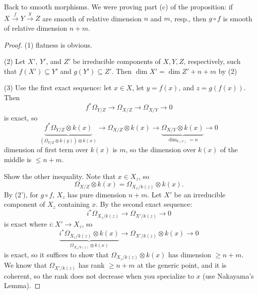  Back to smooth morphisms.  We were proving part (c) of the
 proposition: if $X\xrightarrow{f} Y \xrightarrow{g} Z$ are smooth
 of relative dimension $n$ and $m$, resp., then $g\circ f$ is
 smooth of relative dimension $n+m$.
 \begin{proof}
 (1) flatness is obvious.

 (2) Let $X'$, $Y'$, and $Z'$ be irreducible components of
 $X,Y,Z$, respectively, such that $f(X')\subseteq Y'$ and
 $g(Y')\subseteq Z'$.  Then $\dim X' = \dim Z' + n + m$ by (2)

 (3) Use the first exact sequence: let $x\in X$, let $y=f(x)$, and
 $z=g(f(x))$.  Then
 \[
    f^*\Omega_{Y/Z} \to \Omega_{X/Z} \to \Omega_{X/Y} \to 0
 \]
 is exact, so
 \[
    \underbrace{f^*\Omega_{Y/Z}\otimes k(x)}_{(\Omega_{Y/Z}\otimes k(y))\otimes k(x) } \to \Omega_{X/Z}\otimes k(x) \to
    \underbrace{\Omega_{X/Y}\otimes k(x)}_{\dim_{k(x)} = n} \to 0
 \]
 dimension of first term over $k(x)$ is $m$, so the dimension over
 $k(x)$ of the middle is $\le n+m$.

 Show the other inequality.  Note that $x\in X_z$, so
 \[
    \Omega_{X/Z}\otimes k(x) = \Omega_{X_x/k(z)} \otimes k(x).
 \]
 By (2'), for $g\circ f$, $X_z$ has pure dimension $n+m$.  Let
 $X'$ be an irreducible component of $X_z$ containing $x$.  By the
 second exact sequence:
 \[
    i^*\Omega_{X_z/k(z)} \to \Omega_{X'/k(z)} \to 0
 \]
 is exact where $i:X'\to X_z$, so
 \[
    \underbrace{i^*\Omega_{X_z/k(z)}\otimes k(x)}_{\Omega_{X_z/k(z)}\otimes k(x)} \to \Omega_{X'/k(z)}\otimes k(x) \to 0
 \]
 is exact,
 so it suffices to show that $\Omega_{X_z/k(z)}\otimes k(x)$ has
 dimension $\ge n+m$.  We know that $\Omega_{X'/k(z)}$ has rank
 $\ge n+m$ at the generic point, and it is coherent, so the rank
 does not decrease when you specialize to $x$ (use Nakayama's Lemma).
 \end{proof}

